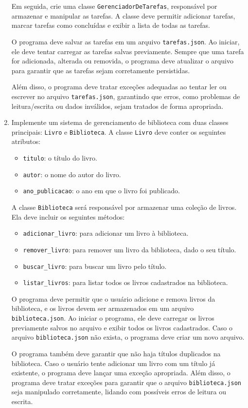 \documentclass[12pt]{article}
\begin{document}
\begin{enumerate}
    Em seguida, crie uma classe \texttt{GerenciadorDeTarefas}, responsável por armazenar e manipular as tarefas. A classe deve permitir adicionar tarefas, marcar tarefas como concluídas e exibir a lista de todas as tarefas.

    O programa deve salvar as tarefas em um arquivo \texttt{tarefas.json}. Ao iniciar, ele deve tentar carregar as tarefas salvas previamente. Sempre que uma tarefa for adicionada, alterada ou removida, o programa deve atualizar o arquivo para garantir que as tarefas sejam corretamente persistidas.

    Além disso, o programa deve tratar exceções adequadas ao tentar ler ou escrever no arquivo \texttt{tarefas.json}, garantindo que erros, como problemas de leitura/escrita ou dados inválidos, sejam tratados de forma apropriada.


  \item Implemente um sistema de gerenciamento de biblioteca com duas classes principais: \texttt{Livro} e \texttt{Biblioteca}. A classe \texttt{Livro} deve conter os seguintes atributos:
  \begin{itemize}
      \item \texttt{titulo}: o título do livro.
      \item \texttt{autor}: o nome do autor do livro.
      \item \texttt{ano\_publicacao}: o ano em que o livro foi publicado.
  \end{itemize}
  
  A classe \texttt{Biblioteca} será responsável por armazenar uma coleção de livros. Ela deve incluir os seguintes métodos:
  \begin{itemize}
      \item \texttt{adicionar\_livro}: para adicionar um livro à biblioteca.
      \item \texttt{remover\_livro}: para remover um livro da biblioteca, dado o seu título.
      \item \texttt{buscar\_livro}: para buscar um livro pelo título.
      \item \texttt{listar\_livros}: para listar todos os livros cadastrados na biblioteca.
  \end{itemize}
  
  O programa deve permitir que o usuário adicione e remova livros da biblioteca, e os livros devem ser armazenados em um arquivo \texttt{biblioteca.json}. Ao iniciar o programa, ele deve carregar os livros previamente salvos no arquivo e exibir todos os livros cadastrados. Caso o arquivo \texttt{biblioteca.json} não exista, o programa deve criar um novo arquivo.
  
  O programa também deve garantir que não haja títulos duplicados na biblioteca. Caso o usuário tente adicionar um livro com um título já existente, o programa deve lançar uma exceção apropriada. Além disso, o programa deve tratar exceções para garantir que o arquivo \texttt{biblioteca.json} seja manipulado corretamente, lidando com possíveis erros de leitura ou escrita.
  

\end{enumerate}
\end{document}
